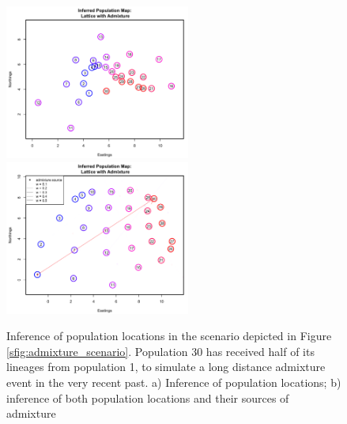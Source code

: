 \documentclass[12pt]{article}
\begin{document}
\begin{figure}
	\centering
			{\includegraphics[width=2.4in,height=2in]{figs/sims/GeoGenMap_corner_admixture_CYOL.png}}
			{\includegraphics[width=2.4in,height=2in]{figs/sims/GeoGenMap_corner_admixture.png}}
	\caption{Inference of population locations in the scenario depicted in Figure \ref{sfig:admixture_scenario}.  Population 30 has received half of its lineages from population 1, to simulate a long distance admixture event in the very recent past. a) Inference of population locations; b) inference of both population locations and their sources of admixture}\label{sfig:corner_admixture_inference}
\end{figure}
\end{document}

